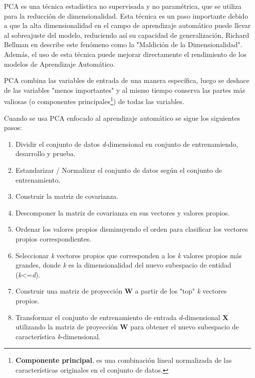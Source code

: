 PCA es una t\'{e}cnica estad\'{i}stica no supervisada y no param\'{e}trica, que se utiliza para la reducci\'{o}n de dimensionalidad. Esta t\'{e}cnica es un paso importante debido a que la alta dimensionalidad en el campo de aprendizaje autom\'{a}tico puede llevar al sobreajuste del modelo, reduciendo as\'{i} su capacidad de generalizaci\'{o}n, Richard Bellman en \cite{40} describe este fen\'{o}meno como la "Maldici\'{o}n de la Dimensionalidad". Adem\'{a}s, el uso de esta t\'{e}cnica puede mejorar directamente el rendimiento de los modelos de Aprendizaje Autom\'{a}tico.

\vspace{5mm} %

PCA combina las variables de entrada de una manera espec\'{i}fica, luego se deshace de las variables "menos importantes" y al mismo tiempo conserva las partes m\'{a}s valiosas (o componentes principales\footnote{\textbf{Componente principal}, es una combinaci\'{o}n lineal normalizada de las caracter\'{i}sticas originales en el conjunto de datos.}) de todas las variables.

\vspace{5mm} %

Cuando se usa PCA enfocado al aprendizaje autom\'{a}tico se sigue los siguientes pasos:

\begin{enumerate}

\item Dividir el conjunto de datos \textit{d}-dimensional en conjunto de entrenamiendo, desarrollo y prueba.
\item Estandarizar / Normalizar el conjunto de datos seg\'{u}n el conjunto de entrenamiento.
\item Construir la matriz de covarianza.
\item Descomponer la matriz de covarianza en sus vectores y valores propios.
\item Ordenar los valores propios disminuyendo el orden para clasificar los vectores propios correspondientes.
\item Seleccionar \textit{k} vectores propios que corresponden a los \textit{k} valores propios m\'{a}s grandes, donde \textit{k} es la dimensionalidad del nuevo subespacio de entidad (\textit{k}<=\textit{d}).
\item Construir una matriz de proyecci\'{o}n \textbf{W} a partir de los "top" \textit{k} vectores propios.
\item Transformar el conjunto de entrenamiento de entrada \textit{d}-dimensional \textbf{X} utilizando la matriz de proyecci\'{o}n \textbf{W} para obtener el nuevo subespacio de caracter\'{i}stica \textit{k}-dimensional.

\end{enumerate}


